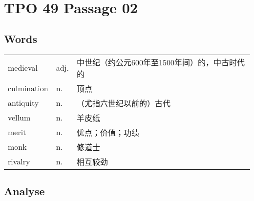 \section{TPO 49 Passage 02}

\subsection{Words}

\begin{tabular}{lll}
    medieval    & adj. & 中世纪（约公元600年至1500年间）的，中古时代的 \\
    culmination & n.   & 顶点                         \\
    antiquity   & n.   & （尤指六世纪以前的）古代               \\
    vellum      & n.   & 羊皮纸                        \\
    merit       & n.   & 优点；价值；功绩                   \\
    monk        & n.   & 修道士                        \\
    rivalry     & n.   & 相互较劲                       \\
\end{tabular}

\subsection{Analyse}

